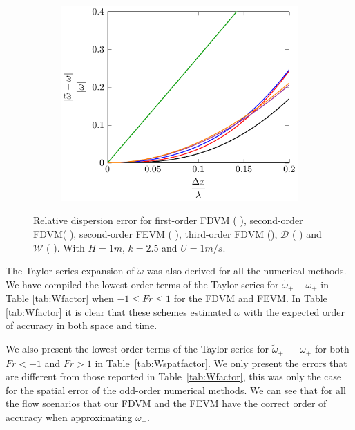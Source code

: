 \begin{figure}
	\begin{subfigure}{0.5\textwidth}
		\includegraphics[width=\textwidth]{./chp4/figures/Dispu1khFillz.pdf}
	\end{subfigure}
	\caption{Relative dispersion error for first-order FDVM ({\color{green!60!black} \solidrule}), second-order FDVM({\color{red} \solidrule}), second-order FEVM ({\color{blue} \solidrule}), third-order FDVM ({\solidrule}), $\mathcal{D}$ ({\color{violet!80!white} \solidrule}) and $\mathcal{W}$ ({\color{orange} \solidrule}). With $H = 1m$, $k = 2.5$ and $U = 1m/s$.}
	\label{fig:Dispu1Fill}
\end{figure}


The Taylor series expansion of $\widetilde{\omega}$ was also derived for all the numerical methods. We have compiled the lowest order terms of the Taylor series for $\widetilde{\omega}_+-\omega_+$ in Table \ref{tab:Wfactor} when $ -1 \le Fr \le 1$ for the FDVM and FEVM. In Table \ref{tab:Wfactor} it is clear that these schemes estimated $\omega$ with the expected order of accuracy in both space and time.

We also present the lowest order terms of the Taylor series for $\widetilde{\omega}_+~-~\omega_+$ for both $ Fr < -1$ and $ Fr > 1$ in Table~\ref{tab:Wspatfactor}. We only present the errors that are different from those reported in Table~\ref{tab:Wfactor}, this was only the case for the spatial error of the odd-order numerical methods. We can see that for all the flow scenarios that our FDVM and the FEVM have the correct order of accuracy when approximating $\omega_+$. 

